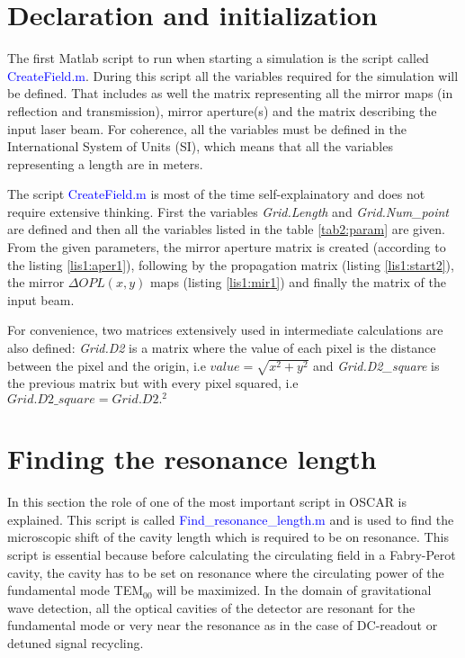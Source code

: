 \section{Declaration and initialization}
\label{sec2:2.2}
The first Matlab script to run when starting a simulation is the script called \textcolor{blue}{CreateField.m}. During this script all the variables required for the simulation will be defined. That includes as well the matrix representing all the mirror maps (in reflection and transmission), mirror aperture(s) and the matrix describing the input laser beam. For coherence, all the variables must be defined in the International System of Units (SI), which means that all the variables representing a length are in meters.

The script \textcolor{blue}{CreateField.m} is most of the time self-explainatory and does not require extensive thinking. First the variables \textsl{Grid.Length} and \textsl{Grid.Num\_point} are defined and then all the variables listed in the table \ref{tab2:param} are given. From the given parameters, the mirror aperture matrix is created (according to the listing \ref{lis1:aper1}), following by the propagation matrix (listing \ref{lis1:start2}), the mirror $\Delta OPL(x,y)$ maps (listing \ref{lis1:mir1}) and finally the matrix of the input beam.

For convenience, two matrices extensively used in intermediate calculations are also defined: \textsl{Grid.D2} is a matrix where the value of each pixel is the distance between the pixel and the origin, i.e $value = \sqrt{x^2+y^2}$ and \textsl{Grid.D2\_square} is the previous matrix but with every pixel squared, i.e $Grid.D2\_square = Grid.D2.^2$

\section{Finding the resonance length}
\label{sec2.2}

In this section the role of one of the most important script in OSCAR is explained. This script is called \textcolor{blue}{Find\_resonance\_length.m} and is used to find the microscopic shift of the cavity length which is required to be on resonance. This script is essential because before calculating the circulating field in a Fabry-Perot cavity, the cavity has to be set on resonance where the circulating power of the fundamental mode TEM$_{00}$ will be maximized. In the domain of gravitational wave detection, all the optical cavities of the detector are resonant for the fundamental mode or very near the resonance as in the case of DC-readout or detuned signal recycling.\\


